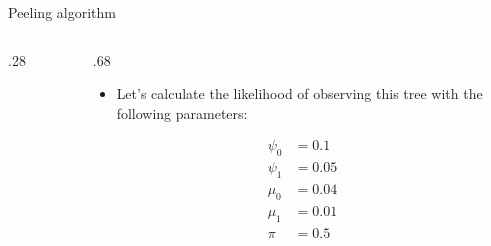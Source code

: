 \documentclass[9pt,handout,ignorenonframetext,]{beamer}
\providecommand{\tightlist}{%
  \setlength{\itemsep}{0pt}\setlength{\parskip}{0pt}}
\newcommand{\includetikz}[2]{
\begin{figure}
\scalebox{#2}{

}
\end{figure}
}
\def\begincols{\begin{columns}[T]}
\def\begincol{\begin{column}[T]}
\def\endcol{\end{column}}
\def\endcols{\end{columns}}
\begin{document}
\begin{frame}[t]{Peeling algorithm}

\begincols

\begincol{.28\textwidth}

\includetikz{simple_tree.tex}{.6}

\endcol

\begincol{.68\textwidth}

\begin{itemize}
\tightlist
\item
  Let's calculate the likelihood of observing this tree with the
  following parameters:
\end{itemize}

\footnotesize

\normalsize

\[
\begin{aligned}
\psi_0 &= 0.1 \\
\psi_1 &= 0.05 \\
\mu_0  &= 0.04  \\
\mu_1  &= 0.01  \\
\pi    &= 0.5  \\
\end{aligned}
\]

\endcol

\endcols

\footnotesize

\normalsize

\end{frame}
\end{document}
